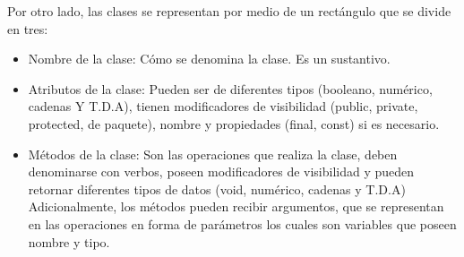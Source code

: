 Por otro lado, las clases se representan por medio de un rectángulo que se divide en tres:
\begin{itemize}
\item Nombre de la clase: Cómo se denomina la clase. Es un sustantivo.
\item Atributos de la clase: Pueden ser de diferentes tipos (booleano, numérico, cadenas Y T.D.A), tienen modificadores de visibilidad (public, private, protected, de paquete), nombre y propiedades (final, const) si es necesario.
\item Métodos de la clase: Son las operaciones que realiza la clase, deben denominarse con verbos, poseen modificadores de visibilidad y pueden retornar diferentes tipos de datos (void, numérico, cadenas y T.D.A) Adicionalmente, los métodos pueden recibir argumentos, que se representan en las operaciones en forma de parámetros los cuales son variables que poseen nombre y tipo.
\end{itemize}
 
